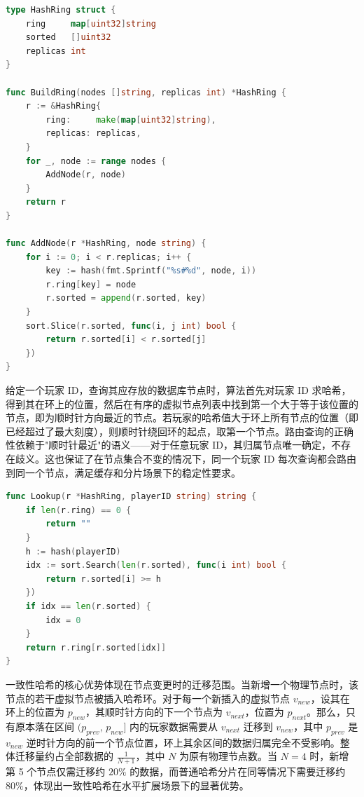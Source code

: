 \begin{tcolorbox}[title=算法一：构建一致性哈希环]
\begin{lstlisting}[style=codeblock, language=go]
type HashRing struct {
    ring     map[uint32]string
    sorted   []uint32
    replicas int
}

func BuildRing(nodes []string, replicas int) *HashRing {
    r := &HashRing{
        ring:     make(map[uint32]string),
        replicas: replicas,
    }
    for _, node := range nodes {
        AddNode(r, node)
    }
    return r
}

func AddNode(r *HashRing, node string) {
    for i := 0; i < r.replicas; i++ {
        key := hash(fmt.Sprintf("%s#%d", node, i))
        r.ring[key] = node
        r.sorted = append(r.sorted, key)
    }
    sort.Slice(r.sorted, func(i, j int) bool {
        return r.sorted[i] < r.sorted[j]
    })
}
\end{lstlisting}
\end{tcolorbox}

给定一个玩家 ID，查询其应存放的数据库节点时，算法首先对玩家 ID 求哈希，得到其在环上的位置，然后在有序的虚拟节点列表中找到第一个大于等于该位置的节点，即为顺时针方向最近的节点。若玩家的哈希值大于环上所有节点的位置（即已经超过了最大刻度），则顺时针绕回环的起点，取第一个节点。路由查询的正确性依赖于"顺时针最近"的语义——对于任意玩家 ID，其归属节点唯一确定，不存在歧义。这也保证了在节点集合不变的情况下，同一个玩家 ID 每次查询都会路由到同一个节点，满足缓存和分片场景下的稳定性要求。

\begin{tcolorbox}[title=算法二：路由查询]
\begin{lstlisting}[style=codeblock, language=go]
func Lookup(r *HashRing, playerID string) string {
    if len(r.ring) == 0 {
        return ""
    }
    h := hash(playerID)
    idx := sort.Search(len(r.sorted), func(i int) bool {
        return r.sorted[i] >= h
    })
    if idx == len(r.sorted) {
        idx = 0
    }
    return r.ring[r.sorted[idx]]
}
\end{lstlisting}
\end{tcolorbox}

一致性哈希的核心优势体现在节点变更时的迁移范围。当新增一个物理节点时，该节点的若干虚拟节点被插入哈希环。对于每一个新插入的虚拟节点 $v_{new}$，设其在环上的位置为 $p_{new}$，其顺时针方向的下一个节点为 $v_{next}$，位置为 $p_{next}$。那么，只有原本落在区间 $(p_{prev},\, p_{new}]$ 内的玩家数据需要从 $v_{next}$ 迁移到 $v_{new}$，其中 $p_{prev}$ 是 $v_{new}$ 逆时针方向的前一个节点位置，环上其余区间的数据归属完全不受影响。整体迁移量约占全部数据的 $\frac{1}{N+1}$，其中 $N$ 为原有物理节点数。当 $N = 4$ 时，新增第 5 个节点仅需迁移约 $20\%$ 的数据，而普通哈希分片在同等情况下需要迁移约 $80\%$，体现出一致性哈希在水平扩展场景下的显著优势。

